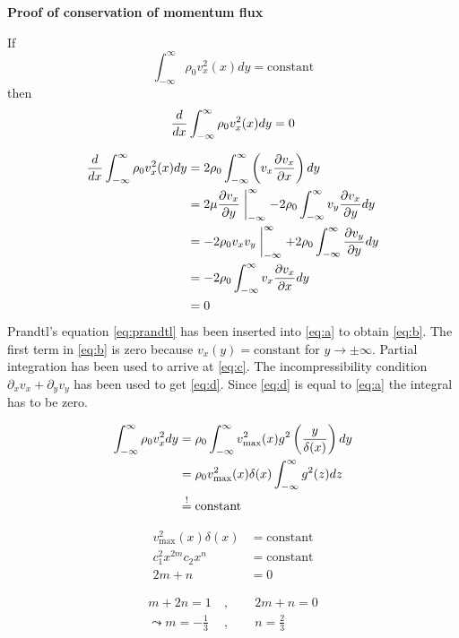 \begin{framed}
\textbf{Proof of conservation of momentum flux}

If
\begin{equation}
\int_{-\infty}^\infty \rho_0v_x^2(x)dy=\mathrm{constant}
\end{equation}
then
\begin{equation}
\frac{d }{d x}\int_{-\infty}^\infty \rho_0v_x^2(x)dy=0
\end{equation}

\begin{align}
\frac{d }{d x}\int_{-\infty}^\infty \rho_0v_x^2(x)dy &= 2\rho_0\int_{-\infty}^\infty\left(v_x\frac{\partial v_x}{\partial x}\right)dy \label{eq:a}\\
&= 2\mu\frac{\partial v_x}{\partial y}\biggm\vert_{-\infty}^\infty-2\rho_0\int_{-\infty}^\infty v_y\frac{\partial v_x}{\partial y}dy \label{eq:b}\\
&=-2\rho_0v_xv_y\biggm\vert_{-\infty}^\infty + 2\rho_0 \int_{-\infty}^\infty\frac{\partial v_y}{\partial y}dy \label{eq:c}\\
&= -2\rho_0\int_{-\infty}^\infty v_x\frac{\partial v_x}{\partial x}dy \label{eq:d}\\
&= 0
\end{align}
Prandtl's equation \eqref{eq:prandtl} has been inserted into \eqref{eq:a} to obtain \eqref{eq:b}. The first term in \eqref{eq:b} is zero because $v_x(y)=\text{constant}$ for $y\rightarrow\pm\infty$. Partial integration has been used to arrive at \eqref{eq:c}. The incompressibility condition $\partial_xv_x+\partial_yv_y$ has been used to get \eqref{eq:d}. Since \eqref{eq:d} is equal to \eqref{eq:a} the integral has to be zero.
\end{framed}

\begin{align}
\int_{-\infty}^\infty\rho_0v_x^2dy &= \rho_0\int_{-\infty}^\infty v_\mathrm{max}^2(x)g^2\left(\frac{y}{\delta(x)}\right)dy\\
&= \rho_0v_\mathrm{max}^2(x)\delta(x)\int_{-\infty}^\infty g^2(z)dz\\
&\overset{!}{=} \mathrm{constant}
\end{align}

\begin{align}
v_\mathrm{max}^2(x)\delta(x)&=\mathrm{constant}\\
c_1^2x^{2m}c_2x^n &= \mathrm{constant}\\
2m+n &= 0
\end{align}

\begin{align}
m+2n=1\ &,\qquad 2m+n=0 \\
\leadsto
m=-\frac{1}{3}\ &,\qquad n=\frac{2}{3}
\end{align}

